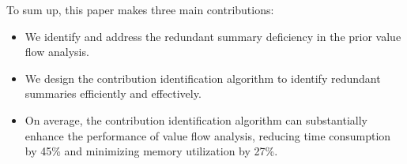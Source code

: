 To sum up, this paper makes three main contributions:
\begin{itemize}
    \item We identify and address the redundant summary deficiency in the prior value flow analysis.
    \item We design the contribution identification algorithm to identify redundant summaries efficiently and effectively.
    \item On average, the contribution identification algorithm can substantially enhance the performance of value flow analysis, reducing time consumption by 45\% and minimizing memory utilization by 27\%.
\end{itemize}
